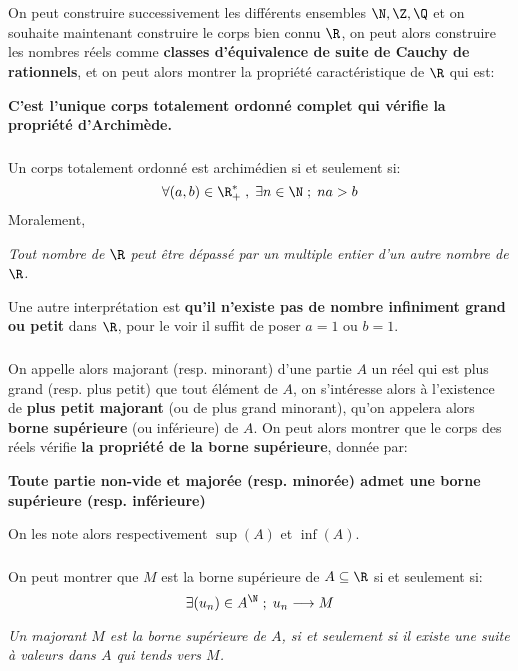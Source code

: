 \chapter*{} %
On peut construire successivement les différents ensembles \(\N, \Z, \Q\) et on souhaite maintenant construire le corps bien connu \(\R\), on peut alors construire les nombres réels comme \textbf{classes d'équivalence de suite de Cauchy de rationnels}, et on peut alors montrer la propriété caractéristique de \(\R\) qui est:
\begin{center}
   \textbf{C'est l'unique corps totalement ordonné complet qui vérifie la propriété d'Archimède.}
\end{center}
\subsection*{}
Un corps totalement ordonné est archimédien si et seulement si:
\[
   \forall (a, b) \in \R^*_+ \; , \; \exists n \in \N \; ; \; na > b
\]
Moralement,
\begin{center}
    \textit{
        Tout nombre de \(\R\) peut être dépassé par un multiple entier d'un autre nombre de \(\R\).
    }
\end{center}
Une autre interprétation est \textbf{qu'il n'existe pas de nombre infiniment grand ou petit} dans \(\R\), pour le voir il suffit de poser \(a = 1\) ou \(b = 1\).
\subsection*{}
On appelle alors majorant (resp. minorant) d'une partie \(A\) un réel qui est plus grand (resp. plus petit) que tout élément de \(A\), on s'intéresse alors à l'existence de \textbf{plus petit majorant} (ou de plus grand minorant), qu'on appelera alors \textbf{borne supérieure} (ou inférieure) de \(A\).
On peut alors montrer que le corps des réels vérifie \textbf{la propriété de la borne supérieure}, donnée par:
\begin{center}
   \textbf{Toute partie non-vide et majorée (resp. minorée) admet une borne supérieure (resp. inférieure)}
\end{center}
On les note alors respectivement \(\sup(A)\) et \(\inf(A)\).
\subsection*{}
On peut montrer que \(M\) est la borne supérieure de \(A \subseteq \R\) si et seulement si:  
\[
   \exists (u_n) \in A^\N \; ; \; u_n \longrightarrow M
\]
\begin{center}
    \textit{
        Un majorant \(M\) est la borne supérieure de \(A\), si et seulement si il existe une suite à valeurs dans \(A\) qui tends vers \(M\).
    }
\end{center}
